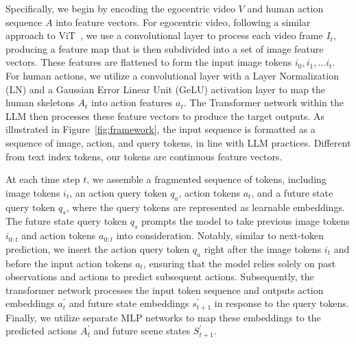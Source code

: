 Specifically, we begin by encoding the egocentric video $V$ and human action sequence $A$ into feature vectors.
For egocentric video, following a similar approach to ViT~\cite{dosovitskiy2020image}, we use a convolutional layer to process each video frame $I_t$, producing a feature map that is then subdivided into a set of image feature vectors. These features are flattened to form the input image tokens $i_0, i_1, ... i_t$.
For human actions, we utilize a convolutional layer with a Layer Normalization (LN) and a Gaussian Error Linear Unit (GeLU) activation layer to map the human skeletons $A_t$ into action features $a_t$.
The Transformer network within the LLM then processes these feature vectors to produce the target outputs.
As illustrated in Figure~\ref{fig:framework}, the input sequence is formatted as a sequence of image, action, and query tokens, in line with LLM practices.
Different from text index tokens, our tokens are continuous feature vectors.

At each time step $t$, we assemble a fragmented sequence of tokens, including image tokens $i_t$, an action query token $q_{a}$, action tokens $a_t$, and a future state query token $q_{s}$, where the query tokens are represented as learnable embeddings. 
The future state query token $q_{s}$ prompts the model to take previous image tokens $i_{0:t}$ and action tokens $a_{0:t}$ into consideration. Notably, similar to next-token prediction, we insert the action query token $q_{a}$ right after the image tokens $i_t$ and before the input action tokens $a_t$, ensuring that the model relies solely on past observations and actions to predict subsequent actions.
Subsequently, the transformer network processes the input token sequence and outputs action embeddings $a_{t}^{'}$ and future state embeddings $s_{t+1}^{'}$ in response to the query tokens.
Finally, we utilize separate MLP networks to map these embeddings to the predicted actions $A_{t}^{'}$ and future scene states $S_{t+1}^{'}$.

